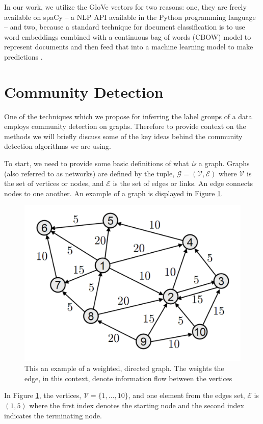\documentclass[../thesis.tex]{subfiles}
\begin{document}
In our work, we utilize the GloVe vectors for two reasons: one, they are freely
available on spaCy -- a NLP API available in the Python programming language --
and two, because a standard technique for document classification is to use word
embeddings combined with a continuous bag of words (CBOW) model to represent
documents and then feed that into a machine learning model to make predictions
\cite{mikolov2013efficient}.

\section{Community Detection}
One of the techniques which we propose for inferring the label groups of a data
employs community detection on graphs. Therefore to provide context on the
methods we will briefly discuss some of the key ideas behind the community
detection algorithms we are using.

To start, we need to provide some basic definitions of what \textit{is} a graph.
Graphs (also referred to as networks) are defined by the tuple, $\mathcal{G} =
(\mathcal{V}, \mathcal{E})$ where $\mathcal{V}$ is the set of vertices or nodes,
and $\mathcal{E}$ is the set of edges or links. An edge connects nodes to one
another. An example of a graph is displayed in Figure \ref{fig:simple_graph}.
\begin{figure}
    \centering
    \includegraphics[width=.7\linewidth]{images/simple_graph.pdf}
    \caption[Example Graph]{This an example of a weighted, directed graph. The
    weights the edge, in this context, denote information flow between the
    vertices}
    \label{fig:simple_graph}
\end{figure}
In Figure \ref{fig:simple_graph}, the vertices, $\mathcal{V} = \{1, \ldots,
10\}$, and one element from the edges set, $\mathcal{E}$ is $(1, 5)$ where the
first index denotes the starting node and the second index indicates the
terminating node.
\end{document}
